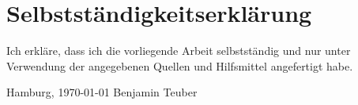 \documentclass[11pt, a4paper, bibgerm]{scrbook}
\begin{document}
\cleardoublepage





\listoffigures
{}

\chapter*{Selbstständigkeitserklärung}

Ich erkläre, dass ich die vorliegende Arbeit selbstständig und nur unter
Verwendung der angegebenen Quellen und Hilfsmittel angefertigt habe.
\vskip 2cm
\begin{flushright}
Hamburg, \today
\vskip 1cm
Benjamin Teuber
\end{flushright}
\end{document}
